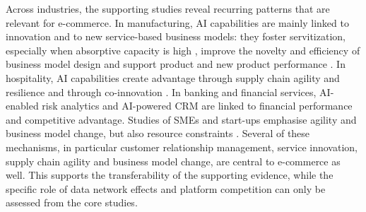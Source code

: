 Across industries, the supporting studies reveal recurring patterns that are relevant for e-commerce. In manufacturing, AI capabilities are mainly linked to innovation and to new service-based business models: they foster servitization, especially when absorptive capacity is high , improve the novelty and efficiency of business model design  and support product and new product performance . In hospitality, AI capabilities create advantage through supply chain agility and resilience  and through co-innovation . In banking and financial services, AI-enabled risk analytics  and AI-powered CRM  are linked to financial performance and competitive advantage. Studies of SMEs and start-ups emphasise agility and business model change, but also resource constraints . Several of these mechanisms, in particular customer relationship management, service innovation, supply chain agility and business model change, are central to e-commerce as well. This supports the transferability of the supporting evidence, while the specific role of data network effects and platform competition can only be assessed from the core studies.

